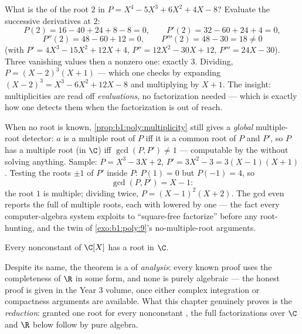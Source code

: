 \begin{example}\label{ex:b1:poly:multexample}
What is the  of the root $2$ in $P = X^4 - 5X^3 + 6X^2
+ 4X - 8$? Evaluate the successive derivatives at $2$:
\[
P(2) = 16 - 40 + 24 + 8 - 8 = 0, \qquad
P'(2) = 32 - 60 + 24 + 4 = 0,
\]
\[
P''(2) = 48 - 60 + 12 = 0, \qquad
P'''(2) = 48 - 30 = 18 \neq 0
\]
(with $P' = 4X^3 - 15X^2 + 12X + 4$, $P'' = 12X^2 - 30X + 12$,
$P''' = 24X - 30$). Three vanishing values then a nonzero one:
 exactly $3$. Dividing, $P = (X - 2)^3(X + 1)$ ---
which one checks by expanding $(X-2)^3 = X^3 - 6X^2 + 12X - 8$ and
multiplying by $X + 1$. The insight: multiplicities are read off
\emph{evaluations}, no factorization needed --- which is exactly
how one detects them when the factorization is out of reach.
\end{example}

\begin{example}\label{ex:b1:poly:gcdmultiple}
When no root is known, \cref{prop:b1:poly:multiplicity} still
gives a \emph{global} multiple-root detector: $a$ is a multiple
root of $P$ iff it is a common root of $P$ and $P'$, so $P$ has a
multiple root (in $\C$) iff $\gcd(P, P') \neq 1$ --- computable by
the  without solving anything. Sample: $P =
X^3 - 3X + 2$, $P' = 3X^2 - 3 = 3(X - 1)(X + 1)$. Testing the
roots $\pm1$ of $P'$ inside $P$: $P(1) = 0$ but $P(-1) = 4$, so
\[
\gcd(P, P') = X - 1 :
\]
the root $1$ is multiple; dividing twice, $P = (X - 1)^2(X + 2)$.
The gcd even reports the full  of multiple roots, each with
 lowered by one --- the fact every computer-algebra
system exploits to ``square-free factorize'' before any
root-hunting, and the  twin of
\cref{exo:b1:poly:9}'s no-multiple-root arguments.
\end{example}

\begin{theorem}\label{thm:b1:poly:fta}
Every nonconstant  of $\C[X]$ has a root in
$\C$.
\end{theorem}
\admitted

\begin{remark}
Despite its name, the theorem is a  of \emph{analysis}:
every known proof uses the completeness of $\R$ in some form, and
none is purely algebraic --- the honest proof is given in the
Year 3 volume, once either complex integration or compactness
arguments are available. What this chapter genuinely proves is
the \emph{reduction}: granted one root for every nonconstant
, the full factorizations over $\C$ and $\R$ below
follow by pure algebra.
\end{remark}

